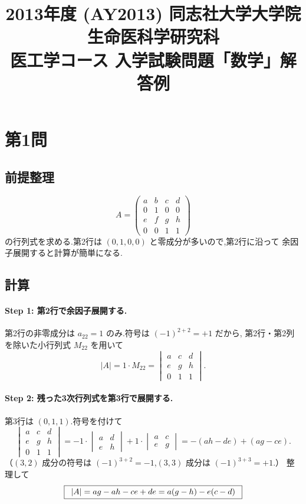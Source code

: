 \documentclass[11pt,a4paper]{article}
\title{2013年度 (AY2013) 同志社大学大学院 生命医科学研究科\\
医工学コース 入学試験問題「数学」解答例}
\author{}
\date{}
\begin{document}
\maketitle
\vspace{-3em}

\section*{第1問}

\subsection*{前提整理}

\[
A=\begin{pmatrix}a&b&c&d\\0&1&0&0\\e&f&g&h\\0&0&1&1\end{pmatrix}
\]
の行列式を求める.第2行は $(0,1,0,0)$ と零成分が多いので,第2行に沿って
余因子展開すると計算が簡単になる.

\subsection*{計算}

\paragraph{Step 1: 第2行で余因子展開する.}
第2行の非零成分は $a_{22}=1$ のみ.符号は $(-1)^{2+2}=+1$ だから,
第2行・第2列を除いた小行列式 $M_{22}$ を用いて
\[
|A|=1\cdot M_{22}
=\begin{vmatrix}a&c&d\\e&g&h\\0&1&1\end{vmatrix}.
\]

\paragraph{Step 2: 残った3次行列式を第3行で展開する.}
第3行は $(0,1,1)$.符号を付けて
\[
\begin{vmatrix}a&c&d\\e&g&h\\0&1&1\end{vmatrix}
=-1\cdot\begin{vmatrix}a&d\\e&h\end{vmatrix}
+1\cdot\begin{vmatrix}a&c\\e&g\end{vmatrix}
=-(ah-de)+(ag-ce).
\]
（$(3,2)$ 成分の符号は $(-1)^{3+2}=-1$,$(3,3)$ 成分は $(-1)^{3+3}=+1$.）
整理して
\[
\boxed{\,\
|A|=ag-ah-ce+de=a(g-h)-e(c-d)\ \,}
\]
\end{document}
